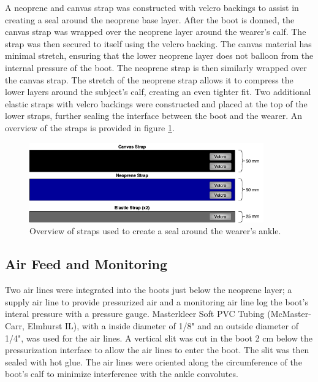 \documentclass[defaultstyle,11pt]{thesis}
\begin{document}
A neoprene and canvas strap was constructed with velcro backings to assist in creating a seal around the neoprene base layer.
After the boot is donned, the canvas strap was wrapped over the neoprene layer around the wearer's calf.
The strap was then secured to itself using the velcro backing.
The canvas material has minimal stretch, ensuring that the lower neoprene layer does not balloon from the internal pressure of the boot.
The neoprene strap is then similarly wrapped over the canvas strap.
The stretch of the neoprene strap allows it to compress the lower layers around the subject's calf, creating an even tighter fit.
Two additional elastic straps with velcro backings were constructed and placed at the top of the lower straps, further sealing the interface between the boot and the wearer.
An overview of the straps is provided in figure \ref{fig:SA4-straps}.

\begin{figure}
\hypertarget{fig:SA4-straps}{%
\centering
\includegraphics[width=0.9\textwidth,height=\textheight]{../fig/SA4/Straps.png}
\caption{Overview of straps used to create a seal around the wearer's ankle.}\label{fig:SA4-straps}
}
\end{figure}

\hypertarget{air-feed-and-monitoring}{%
\subsection{Air Feed and Monitoring}\label{air-feed-and-monitoring}}

Two air lines were integrated into the boots just below the neoprene layer; a supply air line to provide pressurized air and a monitoring air line log the boot's interal pressure with a pressure gauge.
Masterkleer Soft PVC Tubing (McMaster-Carr, Elmhurst IL), with a inside diameter of 1/8" and an outside diameter of 1/4", was used for the air lines.
A vertical slit was cut in the boot 2 cm below the pressurization interface to allow the air lines to enter the boot.
The slit was then sealed with hot glue.
The air lines were oriented along the circumference of the boot's calf to minimize interference with the ankle convolutes.
\end{document}
